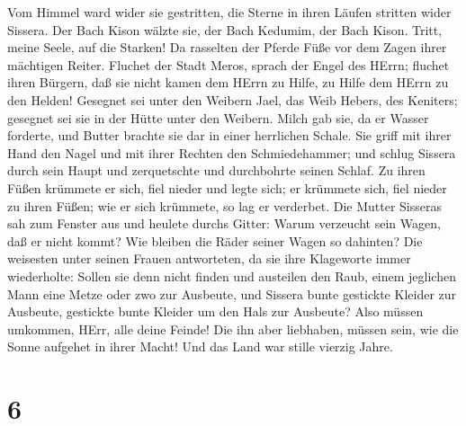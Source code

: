  Vom Himmel ward wider sie gestritten, die Sterne in ihren
Läufen stritten wider Sissera.  Der Bach Kison wälzte sie,
der Bach Kedumim, der Bach Kison. Tritt, meine Seele, auf die Starken!
 Da rasselten der Pferde Füße vor dem Zagen ihrer mächtigen
Reiter.  Fluchet der Stadt Meros, sprach der Engel des
HErrn; fluchet ihren Bürgern, daß sie nicht kamen dem HErrn zu Hilfe, zu
Hilfe dem HErrn zu den Helden!  Gesegnet sei unter den
Weibern Jael, das Weib Hebers, des Keniters; gesegnet sei sie in der
Hütte unter den Weibern.  Milch gab sie, da er Wasser
forderte, und Butter brachte sie dar in einer herrlichen Schale.
 Sie griff mit ihrer Hand den Nagel und mit ihrer Rechten
den Schmiedehammer; und schlug Sissera durch sein Haupt und zerquetschte
und durchbohrte seinen Schlaf.  Zu ihren Füßen krümmete er
sich, fiel nieder und legte sich; er krümmete sich, fiel nieder zu ihren
Füßen; wie er sich krümmete, so lag er verderbet.  Die
Mutter Sisseras sah zum Fenster aus und heulete durchs Gitter: Warum
verzeucht sein Wagen, daß er nicht kommt? Wie bleiben die Räder seiner
Wagen so dahinten?  Die weisesten unter seinen Frauen
antworteten, da sie ihre Klageworte immer wiederholte: 
Sollen sie denn nicht finden und austeilen den Raub, einem jeglichen
Mann eine Metze oder zwo zur Ausbeute, und Sissera bunte gestickte
Kleider zur Ausbeute, gestickte bunte Kleider um den Hals zur Ausbeute?
 Also müssen umkommen, HErr, alle deine Feinde! Die ihn
aber liebhaben, müssen sein, wie die Sonne aufgehet in ihrer Macht! Und
das Land war stille vierzig Jahre.

\hypertarget{section-5}{%
\section{6}\label{section-5}}

